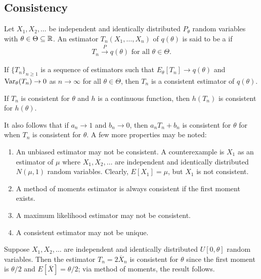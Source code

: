 \subsection{Consistency}

Let $X_{1},X_{2},\ldots$ be independent and identically distributed $P_{\theta}$ random variables with $\theta \in \Theta \subseteq \mathbb{R}$. An estimator $T_{n}(X_{1},\ldots,X_{n})$ of $q(\theta)$ is said to be a  if
\begin{align}
    T_{n} \xrightarrow{P} q(\theta) \text{ for all } \theta \in \Theta.
\end{align}

\begin{theorem}
    If $\{T_{n}\}_{n \geq 1}$ is a sequence of estimators such that $E_{\theta}[T_{n}] \to q(\theta)$ and $\operatorname{Var}_{\theta}(T_{n}) \to 0$ as $n \to \infty$ for all $\theta \in \Theta$, then $T_{n}$ is a consistent estimator of $q(\theta)$.
\end{theorem}

\begin{theorem}
    If $T_{n}$ is consistent for $\theta$ and $h$ is a continuous function, then $h(T_{n})$ is consistent for $h(\theta)$.
\end{theorem}

It also follows that if $a_{n} \to 1$ and $b_{n} \to 0$, then $a_{n}T_{n} + b_{n}$ is consistent for $\theta$ for when $T_{n}$ is consistent for $\theta$. A few more properties may be noted:
\begin{enumerate}
    \item An unbiased estimator may not be consistent. A counterexample is $X_{1}$ as an estimator of $\mu$ where $X_{1},X_{2},\ldots$ are independent and identically distributed $N(\mu,1)$ random variables. Clearly, $E[X_{1}] = \mu$, but $X_{1}$ is not consistent.
    \item A method of moments estimator is always consistent if the first moment exists.
    \item A maximum likelihood estimator may not be consistent.
    \item A consistent estimator may not be unique.
\end{enumerate}

\begin{example}
    Suppose $X_{1},X_{2},\ldots$ are independent and identically distributed $U[0,\theta]$ random variables. Then the estimator $T_{n} = 2\overline{X}_{n}$ is consistent for $\theta$ since the first moment is $\theta/2$ and $E[\overline{X}] = \theta/2$; via method of moments, the result follows.
\end{example}

